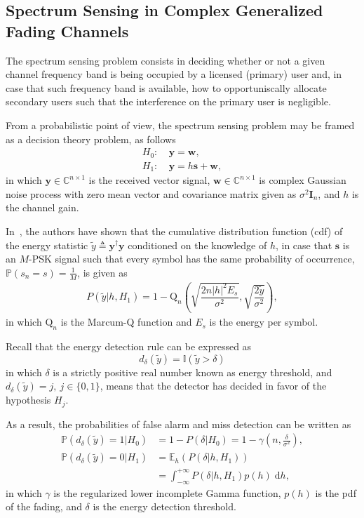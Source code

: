 \documentclass[conference, 10pt]{IEEEtran}
\begin{document}
\subsection{Spectrum Sensing in Complex Generalized Fading Channels}

The spectrum sensing problem consists in deciding whether or not a given channel
frequency band is being occupied by a licensed (primary) user and, in case that such
frequency band is available, how to opportuniscally allocate secondary users
such that the interference on the primary user is negligible.

From a probabilistic point of view, the spectrum sensing problem may be framed as
a decision theory problem, as follows
\begin{align}
    H_0:~& \bm{y} = \bm{w},\\
    H_1:~& \bm{y} = h\bm{s} + \bm{w},
\end{align}
in which $\bm{y} \in \mathbb{C}^{n\times 1}$ is the received vector signal,
$\bm{w} \in \mathbb{C}^{n\times 1}$ is complex Gaussian noise process with zero mean
vector and covariance matrix given as $\sigma^2\bm{I}_n$, and $h$ is the channel gain.

In~\cite{cardoso2017}, the authors have shown that the cumulative distribution function (cdf) of the
energy statistic $\tilde{y} \triangleq \bm{y}^{\dagger}\bm{y}$ conditioned on the knowledge of $h$,
in case that $\bm{s}$ is an $M$-PSK signal such that every symbol has the same probability of occurrence,
$\mathbb{P}(s_n = s) = \frac{1}{M}$, is given as
\begin{align}
    P(\tilde{y} | h, H_1) = 1 - \mathrm{Q}_{n}\left(\sqrt{\dfrac{2n|h|^2E_s}{\sigma^2}}, \sqrt{\dfrac{2\tilde{y}}{\sigma^2}}\right),
\end{align}
in which $\mathrm{Q}_{n}$ is the Marcum-$\mathrm{Q}$ function and $E_s$ is the energy per symbol.

Recall that the energy detection rule can be expressed as
\begin{equation}
    d_\delta (\tilde{y}) = \mathbb{I}(\tilde{y} > \delta)
\end{equation}
in which $\delta$ is a strictly positive real number known as energy threshold,
and $d_\delta (\tilde{y}) = j,~j \in \{0,1\}$, means that the detector has decided
in favor of the hypothesis $H_j$.

As a result, the probabilities of false alarm and miss detection can
be written as
\begin{align}
    \mathbb{P}\left(d_\delta(\tilde{y}) = 1 | H_0\right) &=
        1 -  P(\delta | H_0) = 1 - \gamma\left(n, \frac{\delta}{\sigma^2}\right),\label{eq:pf} \\
    \mathbb{P}\left(d_\delta(\tilde{y}) = 0 | H_1\right) &= \mathbb{E}_{h}\left(P(\delta| h, H_1)\right)\nonumber\\
    &= \int_{-\infty}^{+\infty} P(\delta | h, H_1)p(h)\;\mathrm{d}h,\label{eq:pd}
\end{align}
in which $\gamma$ is the regularized lower incomplete Gamma function, $p(h)$ is the pdf of the fading,
and $\delta$ is the energy detection threshold.
\end{document}
